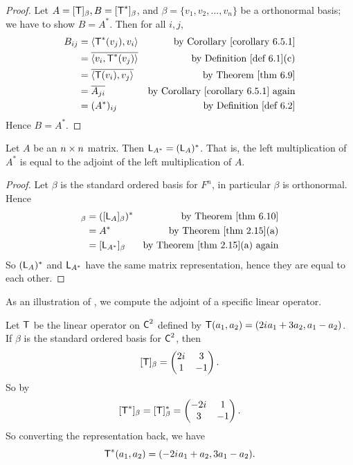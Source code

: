 \begin{proof}
Let \(A = [\textsf{T}]_{\beta}, B = [\textsf{T}^*]_{\beta}\), and \(\beta = \{ v_1, v_2, ..., v_n \}\) be a orthonormal basis; we have to show \(B = A^*\).
Then for all \(i, j\),
\begin{align*}
    B_{ij} & = \LG \T^*(v_j), v_i \RG & \text{by \CORO{6.5.1}} \\
        & = \conjugatet{\LG v_i, \T^*(v_j) \RG} & \text{by \DEF{6.1}(c)} \\
        & = \conjugatet{\LG \T(v_i), v_j \RG} & \text{by \THM{6.9}} \\
        & = \conjugatet{A_{ji}} & \text{by \CORO{6.5.1} again} \\
        & = (A^*)_{ij} & \text{by \DEF{6.2}}
\end{align*}
Hence \(B = A^*\).
\end{proof}

\begin{corollary} \label{corollary 6.10.1}
Let \(A\) be an \(n \times n\) matrix.
Then \(\textsf{L}_{A^*} = (\textsf{L}_A)^*\).
That is, the left multiplication of \(A^*\) is equal to the adjoint of the left multiplication of \(A\).
\end{corollary}

\begin{proof}
Let \(\beta\) is the standard ordered basis for \(F^n\), in particular \(\beta\) is orthonormal.
Hence
\begin{align*}
    [(\LMTRAN_A)^*]_{\beta} & = ([\LMTRAN_A]_{\beta})^* & \text{by \THM{6.10}} \\
    & = A^* & \text{by \THM{2.15}(a)} \\
    & = [\LMTRAN_{A^*}]_{\beta} & \text{by \THM{2.15}(a) again} 
\end{align*}
So \((\textsf{L}_A)^*\) and \(\textsf{L}_{A^*}\) have the same matrix representation, hence they are equal to each other.
\end{proof}

As an illustration of , we compute the adjoint of a specific linear operator.
\begin{example} \label{example 6.3.2}
Let \(\textsf{T}\) be the linear operator on \(\textsf{C}^2\) defined by \(\textsf{T}(a_1, a_2) = (2{i\mkern1mu} a_1 + 3a_2, a_1 - a_2)\).
If \(\beta\) is the standard ordered basis for \(\textsf{C}^2\),
then
\[
    [\textsf{T}]_{\beta} = \begin{pmatrix}
        2 {i\mkern1mu} & 3 \\ 1 & -1
    \end{pmatrix}.
\]
So by 
\[
    [\textsf{T}^*]_{\beta} = [\textsf{T}]_{\beta}^* = \begin{pmatrix}
        -2 {i\mkern1mu} & 1 \\ 3 & -1
    \end{pmatrix}.
\]
So converting the representation back, we have
\[
    \textsf{T}^*(a_1, a_2) = (-2{i\mkern1mu} a_1 + a_2, 3 a_1 - a_2).
\]
\end{example}

